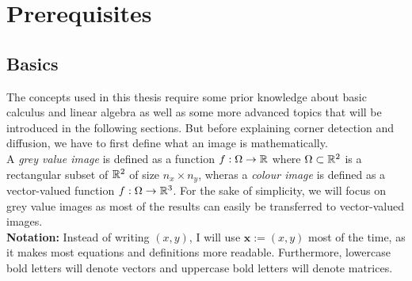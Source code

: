 \chapter{Prerequisites}\label{ch:Theory}
\section{Basics}\label{sec:Basics}
The concepts used in this thesis require some prior knowledge about basic calculus and linear
algebra as well as some more advanced topics that will be introduced in the following sections.
But before explaining corner detection and diffusion, we have to first define what an image is
mathematically.\\
A \textit{grey value image} is defined as a function $f: \Omega \rightarrow \mathbb{R}$ where
$\Omega \subset \mathbb{R}^2$ is a rectangular subset of $\mathbb{R}^2$ of size $n_x\times n_y$,
wheras a
\textit{colour image} is defined as a vector-valued function $f: \Omega \rightarrow \mathbb{R}^3$.
For the sake of simplicity, we will focus on grey value images as most of the results can easily be
transferred to vector-valued images.\\
\textbf{Notation:} Instead of writing $(x, y)$, I will use $\boldsymbol x := (x, y)$ most of the
time, as it makes most equations and definitions more readable. Furthermore, lowercase bold letters will denote vectors and uppercase bold letters will
denote matrices.
